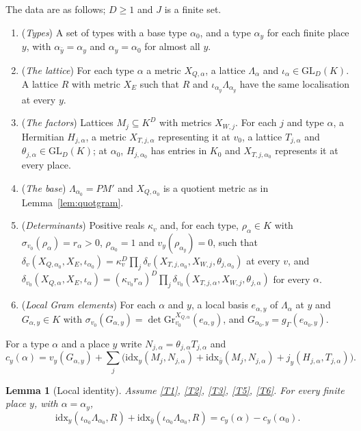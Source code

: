 \documentclass[11pt]{amsart}
\theoremstyle{plain}
\newtheorem{lemma}[theorem]{Lemma}
\theoremstyle{definition}
\numberwithin{equation}{section}
\begin{document}
The data are as follows; $D\ge1$ and $J$ is a finite set.
\begin{enumerate}[label=\textup{(T\arabic*)}, leftmargin=3.2em]
\item\label{T1} (\emph{Types}) A set of types with a base type $\alpha_0$, and a type $\alpha_y$ for each
  finite place $y$, with $\alpha_{\bar y}=\alpha_y$ and $\alpha_y=\alpha_0$ for almost all $y$.
\item\label{T2} (\emph{The lattice}) For each type $\alpha$ a metric $X_{Q,\alpha}$, a lattice $\Lambda_\alpha$ and
  $\iota_\alpha\in\mathrm{GL}_D(K)$. A lattice $R$ with metric $X_E$ such that $R$ and
  $\iota_{\alpha_y}\Lambda_{\alpha_y}$ have the same localisation at every $y$.
\item\label{T3} (\emph{The factors}) Lattices $M_j\subseteq K^D$ with metrics $X_{W,j}$. For each $j$ and type $\alpha$,
  a Hermitian $H_{j,\alpha}$, a metric $X_{T,j,\alpha}$ representing it at $v_0$, a lattice $T_{j,\alpha}$ and
  $\theta_{j,\alpha}\in\mathrm{GL}_D(K)$; at $\alpha_0$, $H_{j,\alpha_0}$ has entries in $K_0$ and $X_{T,j,\alpha_0}$
  represents it at every place.
\item\label{T4} (\emph{The base}) $\Lambda_{\alpha_0}=PM'$ and $X_{Q,\alpha_0}$ is a quotient metric as in
  Lemma~\ref{lem:quotgram}.
\item\label{T5} (\emph{Determinants}) Positive reals $\kappa_v$ and, for each type, $\rho_\alpha\in K$ with
  $\sigma_{v_0}(\rho_\alpha)=r_\alpha>0$, $\rho_{\alpha_0}=1$ and $v_y(\rho_{\alpha_y})=0$, such that
  $\delta_v(X_{Q,\alpha_0},X_E,\iota_{\alpha_0})=\kappa_v^D\prod_j\delta_v(X_{T,j,\alpha_0},X_{W,j},\theta_{j,\alpha_0})$ at every
  $v$, and $\delta_{v_0}(X_{Q,\alpha},X_E,\iota_\alpha)=(\kappa_{v_0}r_\alpha)^D\prod_j\delta_{v_0}(X_{T,j,\alpha},X_{W,j},\theta_{j,\alpha})$ for
  every $\alpha$.
\item\label{T6} (\emph{Local Gram elements}) For each $\alpha$ and $y$, a local basis $e_{\alpha,y}$ of $\Lambda_\alpha$
  at $y$ and $G_{\alpha,y}\in K$ with $\sigma_{v_0}(G_{\alpha,y})=\det\mathrm{Gr}^{X_{Q,\alpha}}_{v_0}(e_{\alpha,y})$, and
  $G_{\alpha_0,y}=g_\Gamma(e_{\alpha_0,y})$.
\end{enumerate}
For a type $\alpha$ and a place $y$ write $N_{j,\alpha}=\theta_{j,\alpha}T_{j,\alpha}$ and
\[
c_y(\alpha)=v_y(G_{\alpha,y})+\sum_j\bigl(\mathrm{idx}_y(M_j,N_{j,\alpha})+\mathrm{idx}_{\bar y}(M_j,N_{j,\alpha})+j_y(H_{j,\alpha},T_{j,\alpha})\bigr).
\]

\begin{lemma}[Local identity]\label{lem:localid}
Assume \ref{T1}, \ref{T2}, \ref{T3}, \ref{T5}, \ref{T6}. For every finite place $y$, with $\alpha=\alpha_y$,
\[
\mathrm{idx}_y(\iota_{\alpha_0}\Lambda_{\alpha_0},R)+\mathrm{idx}_{\bar y}(\iota_{\alpha_0}\Lambda_{\alpha_0},R)=c_y(\alpha)-c_y(\alpha_0).
\]
\end{lemma}
\end{document}
